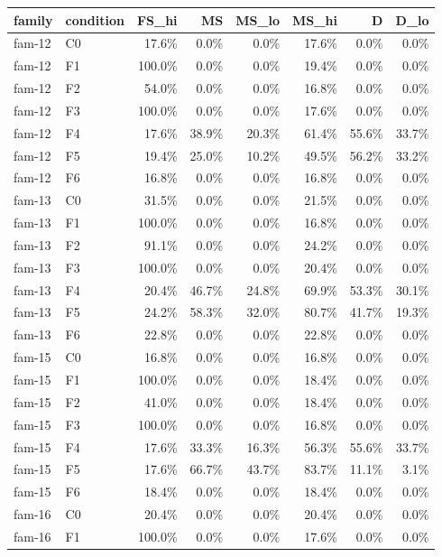 \begin{tabular}{llrrrrrr}
\toprule
family & condition & FS\_hi & MS & MS\_lo & MS\_hi & D & D\_lo \\
\midrule
fam-12 & C0 & 17.6\% & 0.0\% & 0.0\% & 17.6\% & 0.0\% & 0.0\% \\
fam-12 & F1 & 100.0\% & 0.0\% & 0.0\% & 19.4\% & 0.0\% & 0.0\% \\
fam-12 & F2 & 54.0\% & 0.0\% & 0.0\% & 16.8\% & 0.0\% & 0.0\% \\
fam-12 & F3 & 100.0\% & 0.0\% & 0.0\% & 17.6\% & 0.0\% & 0.0\% \\
fam-12 & F4 & 17.6\% & 38.9\% & 20.3\% & 61.4\% & 55.6\% & 33.7\% \\
fam-12 & F5 & 19.4\% & 25.0\% & 10.2\% & 49.5\% & 56.2\% & 33.2\% \\
fam-12 & F6 & 16.8\% & 0.0\% & 0.0\% & 16.8\% & 0.0\% & 0.0\% \\
fam-13 & C0 & 31.5\% & 0.0\% & 0.0\% & 21.5\% & 0.0\% & 0.0\% \\
fam-13 & F1 & 100.0\% & 0.0\% & 0.0\% & 16.8\% & 0.0\% & 0.0\% \\
fam-13 & F2 & 91.1\% & 0.0\% & 0.0\% & 24.2\% & 0.0\% & 0.0\% \\
fam-13 & F3 & 100.0\% & 0.0\% & 0.0\% & 20.4\% & 0.0\% & 0.0\% \\
fam-13 & F4 & 20.4\% & 46.7\% & 24.8\% & 69.9\% & 53.3\% & 30.1\% \\
fam-13 & F5 & 24.2\% & 58.3\% & 32.0\% & 80.7\% & 41.7\% & 19.3\% \\
fam-13 & F6 & 22.8\% & 0.0\% & 0.0\% & 22.8\% & 0.0\% & 0.0\% \\
fam-15 & C0 & 16.8\% & 0.0\% & 0.0\% & 16.8\% & 0.0\% & 0.0\% \\
fam-15 & F1 & 100.0\% & 0.0\% & 0.0\% & 18.4\% & 0.0\% & 0.0\% \\
fam-15 & F2 & 41.0\% & 0.0\% & 0.0\% & 18.4\% & 0.0\% & 0.0\% \\
fam-15 & F3 & 100.0\% & 0.0\% & 0.0\% & 16.8\% & 0.0\% & 0.0\% \\
fam-15 & F4 & 17.6\% & 33.3\% & 16.3\% & 56.3\% & 55.6\% & 33.7\% \\
fam-15 & F5 & 17.6\% & 66.7\% & 43.7\% & 83.7\% & 11.1\% & 3.1\% \\
fam-15 & F6 & 18.4\% & 0.0\% & 0.0\% & 18.4\% & 0.0\% & 0.0\% \\
fam-16 & C0 & 20.4\% & 0.0\% & 0.0\% & 20.4\% & 0.0\% & 0.0\% \\
fam-16 & F1 & 100.0\% & 0.0\% & 0.0\% & 17.6\% & 0.0\% & 0.0\% \\

\end{tabular}
